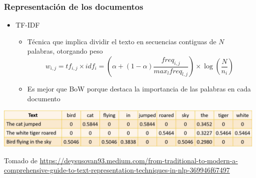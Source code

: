 \documentclass[
10pt, %
aspectratio=169, %
]{beamer}
\begin{document}
	\begin{frame}
		
		\frametitle{Representación de los documentos}
		
		\begin{itemize}
			\item TF-IDF
			
				\begin{itemize}
				\item Técnica que implica dividir el texto en secuencias contiguas de $N$ palabras, otorgando peso
				$$w_{i,j} = tf_{i, j} \times idf_i =(\alpha + (1 - \alpha) \frac{freq_{i,j}}{max_l freq_{l, j}}) \times \log(\frac{N}{n_i}) $$
				
				\pause
				\item Es mejor que BoW porque destaca la importancia de las palabras en cada documento	
			\end{itemize}
			
		\end{itemize}
		
		\pause
		\vspace{2\baselineskip}
		
		\centering
		\includegraphics[scale=0.3]{tf-idf.png}
		
		{\scriptsize Tomado de \url{https://deysusovan93.medium.com/from-traditional-to-modern-a-comprehensive-guide-to-text-representation-techniques-in-nlp-369946f67497}}
		
	\end{frame}
	
	
\end{document}
